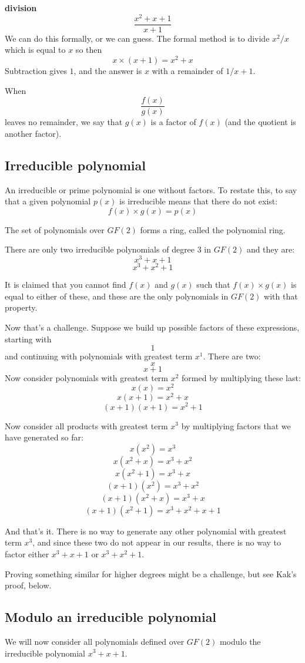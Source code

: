 \documentclass[11pt, oneside]{article}
\begin{document}
\textbf{division}
\[ \frac{x^2 + x + 1}{x + 1} \]
We can do this formally, or we can guess.  The formal method is to divide $x^2/x$ which is equal to $x$ so then
\[ x \times (x + 1) = x^2 + x \]
Subtraction gives $1$, and the answer is $x$ with a remainder of $1/x+1$.

When 
\[ \frac{f(x)}{g(x)} \] 
leaves no remainder, we say that $g(x)$ is a factor of $f(x)$ (and the quotient is another factor).

\subsection*{Irreducible polynomial}

An irreducible or prime polynomial is one without factors.  To restate this, to say that a given polynomial $p(x)$ is irreducible means that there do not exist:
\[ f(x) \times g(x) = p(x) \]

The set of polynomials over $GF(2)$ forms a ring, called the polynomial ring.

There are only two irreducible polynomials of degree 3 in $GF(2)$ and they are:
\[ x^3 + x + 1 \]
\[ x^3 + x^2 + 1 \]

It is claimed that you cannot find $f(x)$ and $g(x)$ such that $f(x) \times g(x)$ is equal to either of these, and these are the only polynomials in $GF(2)$ with that property.

Now that's a challenge.  Suppose we build up possible factors of these expressions, starting with  
\[ 1 \]
and continuing with polynomials with greatest term $x^1$.  There are two:
\[ x \]
\[ x + 1 \]
Now consider polynomials with greatest term $x^2$ formed by multiplying these last:
\[ x (x) = x^2 \]
\[ x (x + 1) = x^2 + x \]
\[ (x + 1)(x + 1) = x^2 + 1 \]

Now consider all products with greatest term $x^3$ by multiplying factors that we have generated so far:
\[ x (x^2) = x^3 \]
\[ x (x^2 + x) = x^3 + x^2 \]
\[ x (x^2 + 1) = x^3 + x \]
\[ (x + 1)(x^2) = x^3 + x^2 \]
\[ (x + 1)(x^2 + x) = x^3 + x \]
\[ (x + 1)(x^2 + 1) = x^3 + x^2 + x + 1 \]

And that's it.  There is no way to generate any other polynomial with greatest term $x^3$, and since these two do not appear in our results, there is no way to factor either $x^3 + x + 1$ or $x^3 + x^2 + 1$.

Proving something similar for higher degrees might be a challenge, but see Kak's proof, below.

\subsection*{Modulo an irreducible polynomial}
We will now consider all polynomials defined over $GF(2)$ modulo the irreducible polynomial $x^3 + x + 1$.
\end{document}
